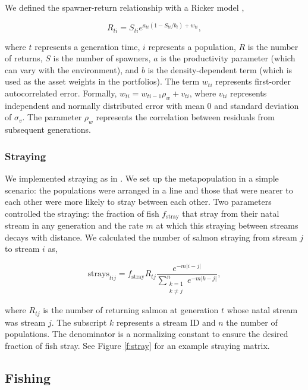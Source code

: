We defined the spawner-return relationship with a Ricker model
\citep{Ricker1954},

\begin{equation}
R_{ti} = S_{ti}e^{a_{ti}(1-S_{ti}/b_i) + w_{ti}},
\end{equation}

\noindent where $t$ represents a generation time, $i$ represents a
population, $R$ is the number of returns, $S$ is the number of spawners,
$a$ is the productivity parameter (which can vary with the environment),
and $b$ is the density-dependent term (which is used as the asset
weights in the portfolios). The term $w_{ti}$ represents first-order
autocorrelated error. Formally, $w_{ti} = w_{ti-1} \rho_w + v_{ti}$,
where $v_{ti}$ represents independent and normally distributed error
with mean 0 and standard deviation of $\sigma_v$. The parameter $\rho_w$
represents the correlation between residuals from subsequent
generations.

\subsubsection{Straying}

We implemented straying as in \citet{Cooper1999}. We set up the
metapopulation in a simple scenario: the populations were arranged in a
line and those that were nearer to each other were more likely to stray
between each other. Two parameters controlled the straying: the fraction
of fish $f_{\mathrm{stray}}$ that stray from their natal stream in any
generation and the rate $m$ at which this straying between streams
decays with distance. We calculated the number of salmon straying from
stream $j$ to stream $i$ as,

\begin{equation}
  \mathrm{strays}_{tij} = f_{\mathrm{stray}} R_{tj}
    \frac{e^{-m \lvert i-j \rvert }}
      {\displaystyle\sum\limits_{\substack{k = 1 \\
    k \neq j}}^{n} e^{-m \lvert k-j \rvert }},
  \label{eq:stray}
\end{equation}

\noindent
where $R_{tj}$ is the number of returning salmon at generation $t$ whose
natal stream was stream $j$. The subscript $k$ represents a stream ID
and $n$ the number of populations. The denominator is a normalizing
constant to ensure the desired fraction of fish stray. See Figure
\ref{f:stray} for an example straying matrix.

\subsection{Fishing}

